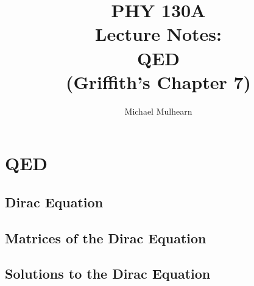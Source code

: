 \documentclass[12pt]{book}
\begin{document}
\title{PHY 130A \\ Lecture Notes: \\ 
QED \\
(Griffith's Chapter 7)}
\author{Michael Mulhearn}

\maketitle

\setcounter{chapter}{7}
\chapter{QED}

\section{Dirac Equation}

\section{Matrices of the Dirac Equation}

\section{Solutions to the Dirac Equation}
\end{document}
